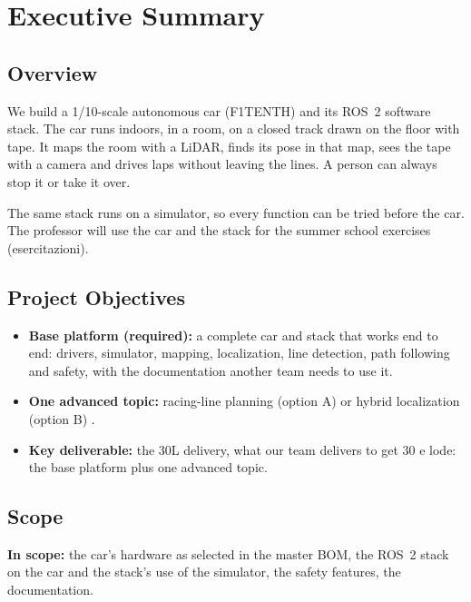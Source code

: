 \documentclass[11pt,a4paper]{article}
\begin{document}

\section{Executive Summary}
\subsection{Overview}
We build a 1/10-scale autonomous car (F1TENTH) and its ROS~2 software stack. The car runs indoors, in a room, on a closed track drawn on the floor with tape. It maps the room with a LiDAR, finds its pose in that map, sees the tape with a camera and drives laps without leaving the lines. A person can always stop it or take it over.

The same stack runs on a simulator, so every function can be tried before the car. The professor will use the car and the stack for the summer school exercises (esercitazioni).

\subsection{Project Objectives}
\begin{itemize}
  \item \textbf{Base platform (required):} a complete car and stack that works end to end: drivers, simulator, mapping, localization, line detection, path following and safety, with the documentation another team needs to use it.
  \item \textbf{One advanced topic:} racing-line planning (option A) or hybrid localization (option B) \tbd[OI-01].
  \item \textbf{Key deliverable:} the 30L delivery, what our team delivers to get 30 e lode: the base platform plus one advanced topic.
\end{itemize}

\subsection{Scope}
\textbf{In scope:} the car's hardware as selected in the master BOM, the ROS~2 stack on the car and the stack's use of the simulator, the safety features, the documentation.
\end{document}

